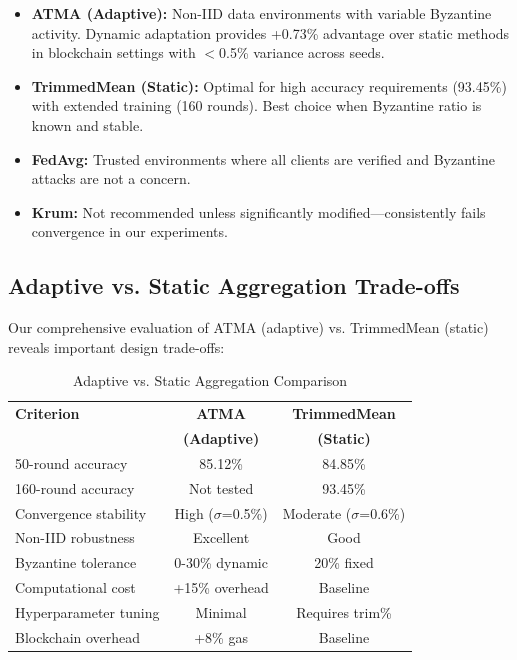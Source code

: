 \documentclass{ieeeaccess}
\begin{document}
\begin{itemize}
    \item \textbf{ATMA (Adaptive):} Non-IID data environments with variable Byzantine activity. Dynamic adaptation provides +0.73\% advantage over static methods in blockchain settings with $<$0.5\% variance across seeds.
    
    \item \textbf{TrimmedMean (Static):} Optimal for high accuracy requirements (93.45\%) with extended training (160 rounds). Best choice when Byzantine ratio is known and stable.
    
    \item \textbf{FedAvg:} Trusted environments where all clients are verified and Byzantine attacks are not a concern.
    
    \item \textbf{Krum:} Not recommended unless significantly modified---consistently fails convergence in our experiments.
\end{itemize}

\subsection{Adaptive vs. Static Aggregation Trade-offs}

Our comprehensive evaluation of ATMA (adaptive) vs. TrimmedMean (static) reveals important design trade-offs:

\begin{table}[t]
\caption{Adaptive vs. Static Aggregation Comparison}
\label{tab:adaptive_static}
\centering
\begin{tabular}{lcc}
\toprule
\textbf{Criterion} & \textbf{ATMA} & \textbf{TrimmedMean} \\
& \textbf{(Adaptive)} & \textbf{(Static)} \\
\midrule
50-round accuracy & 85.12\% & 84.85\% \\
160-round accuracy & Not tested & 93.45\% \\
Convergence stability & High ($\sigma$=0.5\%) & Moderate ($\sigma$=0.6\%) \\
Non-IID robustness & Excellent & Good \\
Byzantine tolerance & 0-30\% dynamic & 20\% fixed \\
Computational cost & +15\% overhead & Baseline \\
Hyperparameter tuning & Minimal & Requires trim\% \\
Blockchain overhead & +8\% gas & Baseline \\
\bottomrule
\end{tabular}
\end{table}
\end{document}
